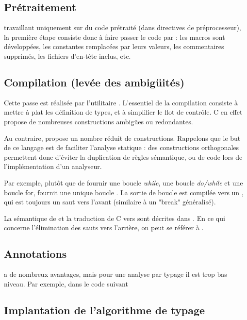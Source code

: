 \subsection{Prétraitement}

\ctonewspeak{} travaillant uniquement sur du code prétraité (dans directives de
préprocesseur), la première étape consiste donc à faire passer le code par \cpp:
les macros sont développées, les constantes remplacées par leurs valeurs, les
commentaires supprimés, les fichiers d'en-tête inclus, etc.

\subsection{Compilation (levée des ambigüités)}

Cette passe est réalisée par l'utilitaire \ctonewspeak{}. L'essentiel de la
compilation consiste à mettre à plat les définition de types, et à simplifier le
flot de contrôle. C en effet propose de nombreuses constructions ambigües ou
redondantes.

Au contraire, \newspeak{} propose un nombre réduit de constructions. Rappelons
que le but de ce langage est de faciliter l'analyse statique : des constructions
orthogonales permettent donc d'éviter la duplication de règles sémantique, ou de
code lors de l'implémentation d'un analyseur.

Par exemple, plutôt que de fournir une boucle \emph{while}, une boucle
\emph{do/while} et une boucle for, \newspeak{} fournit une unique boucle
\npkWhile{}. La sortie de boucle est compilée vers un \npkGoto{}, qui est
toujours un saut vers l'avant (similaire à un "break" généralisé).

La sémantique de \newspeak{} et la traduction de C vers \newspeak{} sont
décrites dans \cite{newspeak}. En ce qui concerne l'élimination des sauts vers
l'arrière, on peut se référer à \cite{goto}.

\subsection{Annotations}

\newspeak{} a de nombreux avantages, mais pour une analyse par typage il est
trop bas niveau. Par exemple, dans le code suivant



\wip{}

\subsection{Implantation de l'algorithme de typage}

